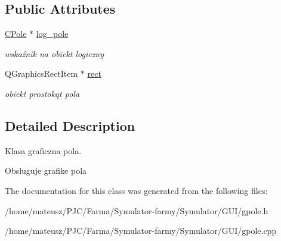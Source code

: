 \subsection*{Public Attributes}
\begin{DoxyCompactItemize}
\item 
\mbox{\label{class_g_pole_af805fd4e1743b7ed58c7a9a84eb133ef}} 
\mbox{\hyperlink{class_c_pole}{C\+Pole}} $\ast$ \mbox{\hyperlink{class_g_pole_af805fd4e1743b7ed58c7a9a84eb133ef}{log\+\_\+pole}}
\begin{DoxyCompactList}\small\item\em wskaźnik na obiekt logiczny \end{DoxyCompactList}\item 
\mbox{\label{class_g_pole_ae40ac10a45cac0ed2050142a8f01d309}} 
Q\+Graphics\+Rect\+Item $\ast$ \mbox{\hyperlink{class_g_pole_ae40ac10a45cac0ed2050142a8f01d309}{rect}}
\begin{DoxyCompactList}\small\item\em obiekt prostokąt pola \end{DoxyCompactList}\end{DoxyCompactItemize}


\subsection{Detailed Description}
Klasa graficzna pola. 

Obsluguje grafike pola 

The documentation for this class was generated from the following files\+:\begin{DoxyCompactItemize}
\item 
/home/mateusz/\+P\+J\+C/\+Farma/\+Symulator-\/farmy/\+Symulator/\+G\+U\+I/gpole.\+h\item 
/home/mateusz/\+P\+J\+C/\+Farma/\+Symulator-\/farmy/\+Symulator/\+G\+U\+I/gpole.\+cpp\end{DoxyCompactItemize}
